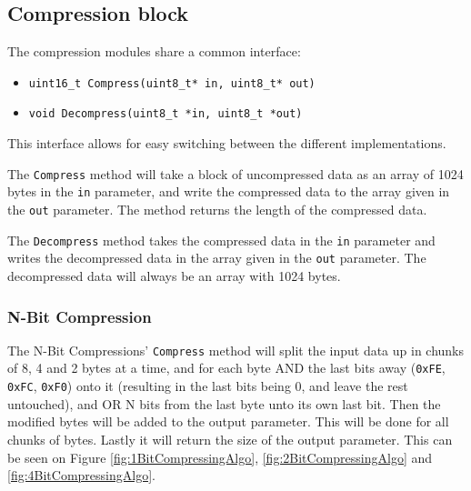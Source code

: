 \subsection{Compression block}
\label{sec:Compression-block}

The compression modules share a common interface: 

\begin{itemize}
    \item \texttt{uint16\_t Compress(uint8\_t* in, uint8\_t* out)}
    \item \texttt{void Decompress(uint8\_t *in, uint8\_t *out)}
\end{itemize}

This interface allows for easy switching between the different implementations.

The \texttt{Compress} method will take a block of uncompressed data as an array of 1024 bytes in the \texttt{in} parameter, and write the compressed data to the array given in the \texttt{out} parameter. The method returns the length of the compressed data.

The \texttt{Decompress} method takes the compressed data in the \texttt{in} parameter and writes the decompressed data in the array given in the \texttt{out} parameter.
The decompressed data will always be an array with 1024 bytes.



\subsubsection{N-Bit Compression}

The N-Bit Compressions' \texttt{Compress} method will split the input data up in chunks of 8, 4 and 2 bytes at a time, and for each byte AND the last bits away (\texttt{0xFE}, \texttt{0xFC}, \texttt{0xF0}) onto it (resulting in the last bits being 0, and leave the rest untouched), and OR N bits from the last byte unto its own last bit.
Then the modified bytes will be added to the output parameter.
This will be done for all chunks of bytes.
Lastly it will return the size of the output parameter.
This can be seen on Figure \ref{fig:1BitCompressingAlgo}, \ref{fig:2BitCompressingAlgo} and \ref{fig:4BitCompressingAlgo}.

